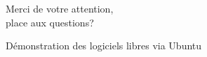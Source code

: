\documentclass{beamer}
\begin{document}
\begin{frame}
\begin{center}
\Huge{Merci de votre attention, \\place aux questions?}
\end{center}
\end{frame}

\begin{frame}
\begin{center}
\Huge{Démonstration des logiciels libres via Ubuntu}
\end{center}
\end{frame}
\end{document}

